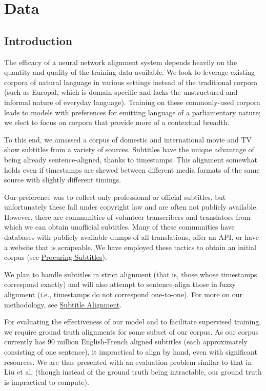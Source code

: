 \documentclass[twoside,twocolumn]{article}
\begin{document}
\section{Data}

\subsection{Introduction}

The efficacy of a neural network alignment system depends heavily on the
quantity and quality of the training data available. We look to leverage
existing corpora of natural language in various settings instead of the
traditional corpora (such as Europal, which is domain-specific and lacks the
unstructured and informal nature of everyday language). Training on these
commonly-used corpora leads to models with preferences for emitting language
of a parliamentary nature; we elect to focus on corpora that
provide more of a contextual breadth.

To this end, we amassed a corpus of domestic and international movie and TV
show subtitles from a variety of sources. Subtitles have the unique advantage
of being already sentence-aligned, thanks to timestamps. This alignment
somewhat holds even if timestamps are skewed between different media
formats of the same source with slightly different timings.

Our preference was to collect only professional or official subtitles, but
unfortunately these fall under copyright law and are often not publicly
available. However, there are communities of volunteer transcribers and
translators from which we can obtain unofficial subtitles. Many of these
communities have databases with publicly available dumps of all translations,
offer an API, or have a website that is scrapeable. We have employed these
tactics to obtain an initial corpus (see
\hyperref[subsec:procuring-subtitles]{Procuring Subtitles}).

We plan to handle subtitles in strict alignment (that is, those whose
timestamps correspond exactly) and will also attempt to sentence-align those in
fuzzy alignment (i.e., timestamps do not correspond one-to-one). For more on
our methodology, see \hyperref[subsec:subtitle-alignment]{Subtitle Alignment}.

For evaluating the effectiveness of our model and to facilitate
supervised training, we require ground truth alignments for some subset of our
corpus. As our corpus currently has 90 million English-French aligned subtitles
(each approximately consisting of one sentence), it impractical to align by
hand, even with significant resources.
We are thus presented with an evaluation problem similar to that in Liu et al.
\cite{liu2015streaming} (though instead of the ground truth being intractable,
our ground truth is impractical to compute).
\end{document}
